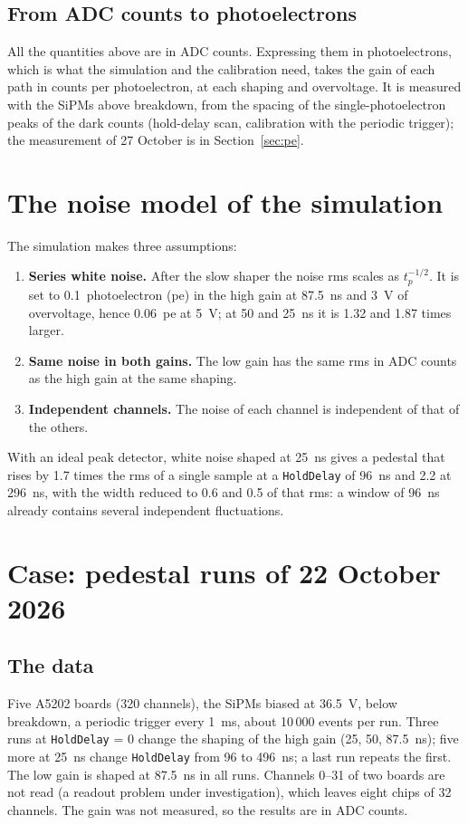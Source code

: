 \documentclass[11pt,a4paper]{article}
\begin{document}
\subsection{From ADC counts to photoelectrons}

All the quantities above are in ADC counts. Expressing them in photoelectrons, which is what
the simulation and the calibration need, takes the gain of each path in counts per
photoelectron, at each shaping and overvoltage. It is measured with the SiPMs above breakdown,
from the spacing of the single-photoelectron peaks of the dark counts (hold-delay scan,
calibration with the periodic trigger); the measurement of 27 October is in
Section~\ref{sec:pe}.

\section{The noise model of the simulation}
\label{sec:model}

The simulation makes three assumptions:
\begin{enumerate}
\item \textbf{Series white noise.} After the slow shaper the noise rms scales as $t_p^{-1/2}$.
  It is set to 0.1~photoelectron (pe) in the high gain at 87.5~ns and 3~V of overvoltage,
  hence 0.06~pe at 5~V; at 50 and 25~ns it is 1.32 and 1.87 times larger.
\item \textbf{Same noise in both gains.} The low gain has the same rms in ADC counts as the
  high gain at the same shaping.
\item \textbf{Independent channels.} The noise of each channel is independent of that of the
  others.
\end{enumerate}
With an ideal peak detector, white noise shaped at 25~ns gives a pedestal that rises by 1.7
times the rms of a single sample at a \texttt{HoldDelay} of 96~ns and 2.2 at 296~ns, with the
width reduced to 0.6 and 0.5 of that rms: a window of 96~ns already contains several
independent fluctuations.

\section{Case: pedestal runs of 22 October 2026}
\label{sec:case1}

\subsection{The data}

Five A5202 boards (320 channels), the SiPMs biased at 36.5~V, below breakdown, a periodic
trigger every 1~ms, about 10\,000 events per run. Three runs at \texttt{HoldDelay} = 0 change
the shaping of the high gain (25, 50, 87.5~ns); five more at 25~ns change \texttt{HoldDelay}
from 96 to 496~ns; a last run repeats the first. The low gain is shaped at 87.5~ns in all runs.
Channels 0--31 of two boards are not read (a readout problem under investigation), which
leaves eight chips of 32 channels. The gain was not measured, so the results are in ADC counts.
\end{document}
